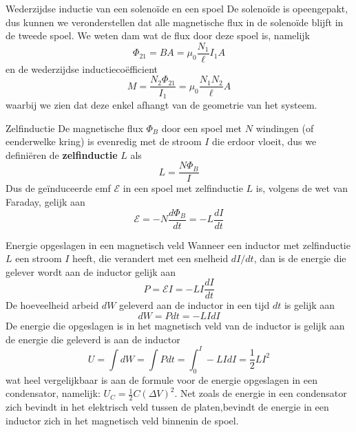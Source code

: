 \begin{app}{Wederzijdse inductie van een solenoïde en een spoel}
    De solenoïde is opeengepakt, dus kunnen we veronderstellen dat alle magnetische flux in de solenoïde blijft in de tweede spoel.
    We weten dam wat de flux door deze spoel is, namelijk
    \begin{equation*}
        \Phi_{21} = BA = \mu_{0}\dfrac{N_{1}}{\ell}I_{1}A
    \end{equation*}
    en de wederzijdse inductiecoëfficient
    \begin{equation*}
        M = \dfrac{N_{2}\Phi_{21}}{I_{1}} = \mu_{0}\dfrac{N_{1}N_{2}}{\ell}A
    \end{equation*}
    waarbij we zien dat deze enkel afhangt van de geometrie van het systeem.
\end{app}

\begin{theo}[Zelfinductie]{Zelfinductie}
    De magnetische flux $\Phi_{B}$ door een spoel met $N$ windingen (of eenderwelke kring) is evenredig met de stroom $I$ die erdoor vloeit, dus we definiëren de \textbf{zelfinductie} $L$ als
    \begin{equation*}
        L = \dfrac{N\Phi_{B}}{I}
    \end{equation*}
    Dus de geïnduceerde emf $\mathcal{E}$ in een spoel met zelfinductie $L$ is, volgens de wet van Faraday, gelijk aan
    \begin{equation*}
        \mathcal{E} = -N\dfrac{d\Phi_{B}}{dt }= - L\dfrac{dI}{dt}
    \end{equation*}
    \vspace{-0.3cm}
\end{theo}

\newpage

\begin{theo}{Energie opgeslagen in een magnetisch veld}
    Wanneer een inductor met zelfinductie $L$ een stroom $I$ heeft, die verandert met een snelheid $dI/dt$, dan is de energie die 
    gelever wordt aan de inductor gelijk aan 
    \begin{equation*}
        P = \mathcal{E}I = -LI\dfrac{dI}{dt}
    \end{equation*}
    De hoeveelheid arbeid $dW$ geleverd aan de inductor in een tijd $dt$ is gelijk aan
    \begin{equation*}
        dW = Pdt = -LIdI
    \end{equation*}
    De energie die opgeslagen is in het magnetisch veld van de inductor is gelijk aan de energie die geleverd is aan de inductor
    \begin{equation*}
        U = \int dW = \int Pdt = \int_{0}^{I} -LIdI = \dfrac{1}{2}LI^{2}
    \end{equation*}
    wat heel vergelijkbaar is aan de formule voor de energie opgeslagen in een condensator, namelijk: $U_{C} = \frac{1}{2}C(\Delta V)^{2}$. 
    Net zoals de energie in een condensator zich bevindt in het elektrisch veld tussen de platen,bevindt de energie in een inductor zich in het magnetisch veld binnenin de spoel.
\end{theo}

